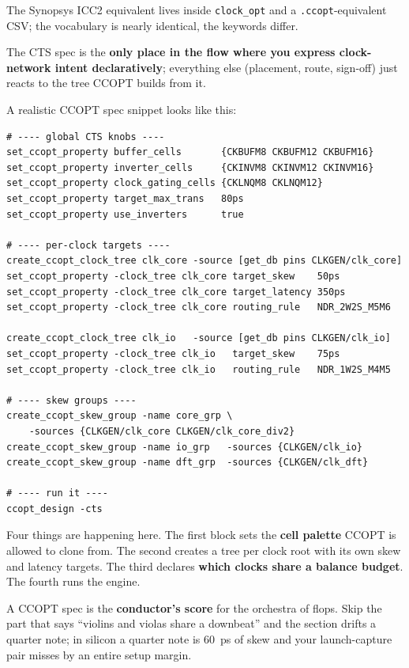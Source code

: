 The Synopsys ICC2 equivalent lives inside \texttt{clock\_opt} and a \texttt{.ccopt}-equivalent CSV; the vocabulary is nearly identical, the keywords differ.

\begin{keyidea}
The CTS spec is the \textbf{only place in the flow where you express clock-network intent declaratively}; everything else (placement, route, sign-off) just reacts to the tree CCOPT builds from it.
\end{keyidea}

A realistic CCOPT spec snippet looks like this:

\begin{lstlisting}[style=eda, caption={Excerpt from a CCOPT spec for a two-clock subsystem.}, label={lst:ccopt-spec}]
# ---- global CTS knobs ----
set_ccopt_property buffer_cells       {CKBUFM8 CKBUFM12 CKBUFM16}
set_ccopt_property inverter_cells     {CKINVM8 CKINVM12 CKINVM16}
set_ccopt_property clock_gating_cells {CKLNQM8 CKLNQM12}
set_ccopt_property target_max_trans   80ps
set_ccopt_property use_inverters      true

# ---- per-clock targets ----
create_ccopt_clock_tree clk_core -source [get_db pins CLKGEN/clk_core]
set_ccopt_property -clock_tree clk_core target_skew    50ps
set_ccopt_property -clock_tree clk_core target_latency 350ps
set_ccopt_property -clock_tree clk_core routing_rule   NDR_2W2S_M5M6

create_ccopt_clock_tree clk_io   -source [get_db pins CLKGEN/clk_io]
set_ccopt_property -clock_tree clk_io   target_skew    75ps
set_ccopt_property -clock_tree clk_io   routing_rule   NDR_1W2S_M4M5

# ---- skew groups ----
create_ccopt_skew_group -name core_grp \
    -sources {CLKGEN/clk_core CLKGEN/clk_core_div2}
create_ccopt_skew_group -name io_grp   -sources {CLKGEN/clk_io}
create_ccopt_skew_group -name dft_grp  -sources {CLKGEN/clk_dft}

# ---- run it ----
ccopt_design -cts
\end{lstlisting}

Four things are happening here. The first block sets the \textbf{cell palette} CCOPT is allowed to clone from. The second creates a tree per clock root with its own skew and latency targets. The third declares \textbf{which clocks share a balance budget}. The fourth runs the engine.

\begin{hook}
A CCOPT spec is the \textbf{conductor's score} for the orchestra of flops. Skip the part that says ``violins and violas share a downbeat'' and the section drifts a quarter note; in silicon a quarter note is 60~ps of skew and your launch-capture pair misses by an entire setup margin.
\end{hook}

